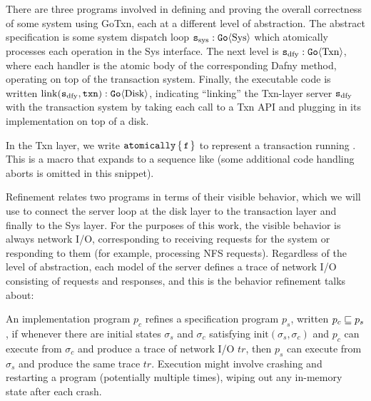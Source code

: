 There are three programs involved in defining and proving the overall
correctness of some system using GoTxn, each at a different level of abstraction.
The abstract specification is some system dispatch loop $\texttt{s}_{\mathrm{sys}} : \mathtt{Go}\langle \mathrm{Sys} \rangle$ which
atomically processes each operation in the Sys interface. The
next level is $\texttt{s}_{\mathrm{dfy}} : \mathtt{Go}\langle \mathrm{Txn} \rangle$, where each handler is the atomic body of the
corresponding Dafny method, operating on top of the transaction system. Finally,
the executable code is written
$\mathrm{link}(\texttt{s}_{\mathrm{dfy}}, \texttt{txn}) : \mathtt{Go}\langle \mathrm{Disk} \rangle$, indicating ``linking'' the
Txn-layer server $\texttt{s}_{\mathrm{dfy}}$ with the transaction system by taking each call to a
Txn API and plugging in its implementation on top of a disk.

In the Txn layer, we write $\atomically{\cc{f}}$ to represent a
transaction running . This is a macro that expands to a
sequence like  (some additional code
handling aborts is omitted in this snippet).

Refinement relates two programs in terms of their visible behavior, which we
will use to connect the server loop at the disk layer to the transaction layer
and finally to the Sys layer. For the purposes of this work, the visible
behavior is always network I/O, corresponding to receiving requests for the
system or responding to them (for example, processing NFS requests). Regardless
of the level of abstraction, each model of the server defines a trace of network
I/O consisting of requests and responses, and this is the behavior refinement
talks about:

\begin{definition}[Refinement]
  An implementation program $p_{c}$ refines a specification program $p_{s}$,
written $p_{c} \sqsubseteq p_{s}$, if whenever there are initial states
$\sigma_{s}$ and $\sigma_{c}$ satisfying $\mathrm{init}(\sigma_{s}, \sigma_{c})$
and $p_{c}$ can execute from $\sigma_{c}$ and produce a trace of network I/O
$\textit{tr}$, then $p_{s}$ can execute from $\sigma_{s}$ and produce the same trace
$\textit{tr}$.  Execution might involve crashing and restarting a program (potentially
multiple times), wiping out any in-memory state after each crash.
  \label{def:refinement}
\end{definition}

